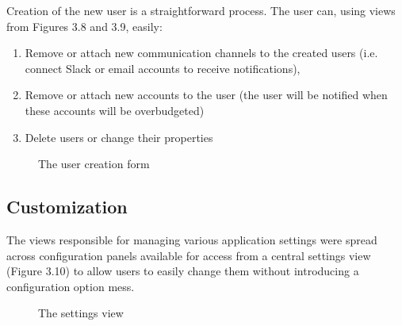 \documentclass[licencjacka,en]{thesisclass}
\begin{document}
    Creation of the new user is a straightforward process.
    The user can, using views from Figures 3.8 and 3.9, easily:
    \begin{enumerate}
        \item Remove or attach new communication channels
          to the created users (i.e. connect Slack or email accounts to receive notifications),
        \item Remove or attach new accounts to the user
          (the user will be notified when these accounts will be overbudgeted)
        \item Delete users or change their properties
    \end{enumerate}
    
    \begin{figure}[!htbp]
      \caption{The user creation form\label{fig:scr-user-create}}
    \end{figure}
    
    \subsection{Customization}
    
    The views responsible for managing various application settings
    were spread across configuration panels available for access
    from a central settings view (Figure 3.10) to allow users to easily change
    them without introducing a configuration option mess.
    
    \begin{figure}[!htbp]
      \caption{The settings view\label{fig:scr-customize}}
    \end{figure}
    
\end{document}
